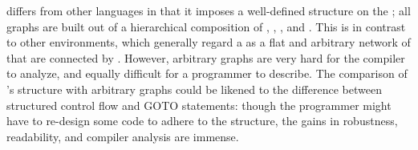 \StreamIt differs from other \stream languages in that it imposes
a well-defined structure on the \streams; all \stream graphs are
built out of a hierarchical composition of \filters, \pipelines,
\splitjoins, and \feedbackloops.  This is in contrast to other
environments, which generally regard a \stream as a flat and
arbitrary network of \filters that are connected by \Channels.
However, arbitrary graphs are very hard for the compiler to
analyze, and equally difficult for a programmer to describe.  The
comparison of \StreamIt's structure with arbitrary \stream graphs
could be likened to the difference between structured control flow
and GOTO statements: though the programmer might have to re-design
some code to adhere to the structure, the gains in robustness,
readability, and compiler analysis are immense.


